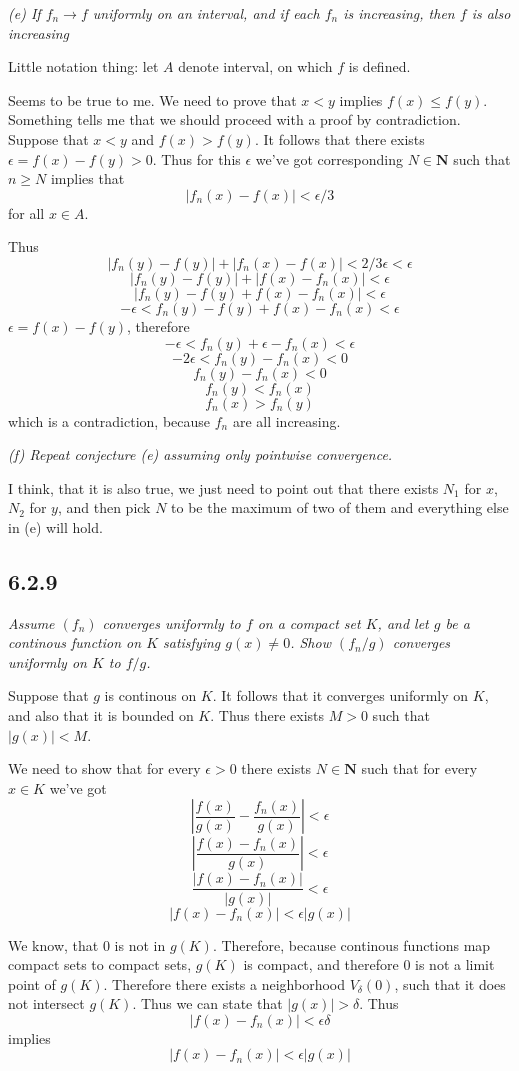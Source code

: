 \documentclass[11pt,oneside,titlepage]{book}
\begin{document}
\textit{(e) If $f_n \to f$ uniformly on an interval, and if each $f_n$ is
  increasing, then $f$ is also increasing}

Little notation thing: let $A$ denote interval, on which $f$ is defined.

Seems to be true to me. We need to prove that $x < y$ implies $f(x) \leq f(y)$.
Something tells me that we should proceed with a proof by contradiction.
Suppose that $x < y$ and $f(x) > f(y)$. It follows that there exists
$\epsilon = f(x) - f(y) > 0$. Thus for this $\epsilon$ we've got
corresponding $N \in \textbf{N}$ such that $n \geq N$ implies that 
$$|f_n(x) - f(x)| < \epsilon/3$$
for all $x \in A$.

Thus
$$|f_n(y) - f(y)| + |f_n(x) - f(x)| < 2/3\epsilon < \epsilon$$
$$|f_n(y) - f(y)| + |f(x) - f_n(x)| < \epsilon$$
$$|f_n(y) - f(y) + f(x) - f_n(x)| < \epsilon$$
$$-\epsilon < f_n(y) - f(y) + f(x) - f_n(x) < \epsilon$$
$\epsilon = f(x) - f(y)$, therefore
$$-\epsilon < f_n(y) + \epsilon - f_n(x) < \epsilon$$
$$-2\epsilon < f_n(y)- f_n(x) < 0$$
$$ f_n(y)- f_n(x) < 0$$
$$ f_n(y) < f_n(x)$$
$$ f_n(x) > f_n(y)$$
which is a contradiction, because $f_n$ are all increasing.

\textit{(f) Repeat conjecture (e) assuming only pointwise convergence.}

I think, that it is also true, we just need to point out that there
exists $N_1$ for $x$, $N_2$ for $y$, and then pick $N$ to be the maximum of
two of them and everything else in (e) will hold.

\subsection*{6.2.9}
\textit{Assume $(f_n)$ converges uniformly to $f$ on a compact set $K$, and
  let $g$ be a continous function on $K$ satisfying $g(x) \neq 0$. Show
  $(f_n/g)$ converges uniformly on $K$ to $f/g$. }

Suppose that $g$ is continous on $K$. It follows that it converges uniformly
on $K$, and also that it is bounded on $K$. Thus there exists $M > 0$
such that $|g(x)| < M$.

We need to show that for every $\epsilon > 0$ there exists $N \in \textbf{N}$
such that for every $x \in K$ we've got
$$\left|\frac{f(x)}{g(x)} - \frac{f_n(x)}{g(x)}\right|  < \epsilon$$
$$\left|\frac{f(x) - f_n(x)}{g(x)}\right|  < \epsilon$$
$$\frac{|f(x) - f_n(x)|}{|g(x)|}  < \epsilon$$
$$|f(x) - f_n(x)|  < \epsilon |g(x)|$$

We know, that $0$ is not in $g(K)$. Therefore, because
continous functions map compact sets to compact sets, $g(K)$ is compact,
and therefore $0$ is not a limit point of $g(K)$. Therefore there exists
a neighborhood $V_\delta(0)$, such that it does not intersect $g(K)$.
Thus we can state that $|g(x)| > \delta$. Thus
$$|f(x) - f_n(x)|  < \epsilon \delta$$
implies
$$|f(x) - f_n(x)|  < \epsilon |g(x)|$$
\end{document}
